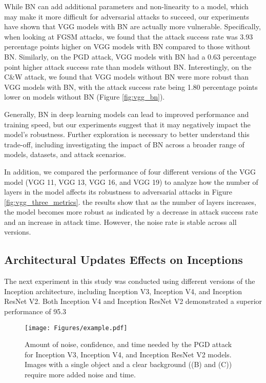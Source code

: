 While BN can add additional parameters and non-linearity to a model, which may make it more difficult for adversarial attacks to succeed, our experiments have shown that VGG models with BN are actually more vulnerable. Specifically, when looking at FGSM attacks, we found that the attack success rate was 3.93 percentage points higher on VGG models with BN compared to those without BN. Similarly, on the PGD attack, VGG models with BN had a 0.63 percentage point higher attack success rate than models without BN. Interestingly, on the C\&W attack, we found that VGG models without BN were more robust than VGG models with BN, with the attack success rate being 1.80 percentage points lower on models without BN (Figure \ref{fig:vgg_bn}). 

Generally, BN in deep learning models can lead to improved performance and training speed, but our experiments suggest that it may negatively impact the model's robustness. Further exploration is necessary to better understand this trade-off, including investigating the impact of BN across a broader range of models, datasets, and attack scenarios. 



In addition, we compared the performance of four different versions of the VGG model (\ie VGG 11, VGG 13, VGG 16, and VGG 19) to analyze how the number of layers in the model affects its robustness to adversarial attacks in Figure \ref{fig:vgg_three_metrics}. the results show that as the number of layers increases, the model becomes more robust as indicated by a decrease in attack success rate and an increase in attack time. However, the noise rate is stable across all versions.

\subsection{Architectural Updates Effects on Inceptions}  
The next experiment in this study was conducted using different versions of the Inception architecture, including Inception V3, Inception V4, and Inception ResNet V2. Both Inception V4 and Inception ResNet V2 demonstrated a superior performance of 95.3\

\begin{figure*}[ht]
    \centering
    \texttt{[image: Figures/example.pdf]}
    \caption{Amount of noise, confidence, and time needed by the PGD attack for Inception V3, Inception V4, and Inception ResNet V2 models. Images with a single object and a clear background ((B) and (C)) require more added noise and time.}
    \label{fig:example} 
\end{figure*} 

